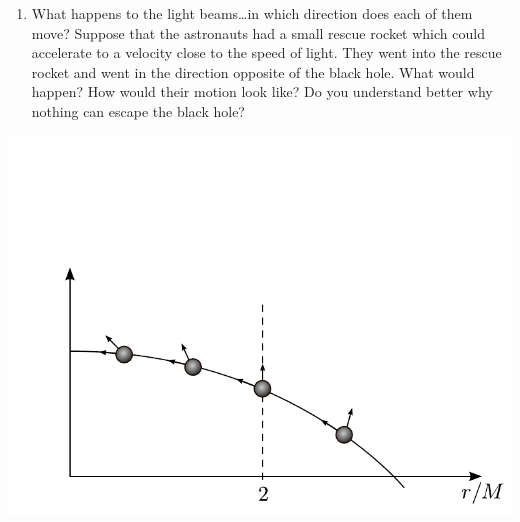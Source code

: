 \begin{multicols}{2}
\begin{enumerate}
\item What happens to the light beams\ldots in which direction does each of them move? Suppose that the astronauts had a small rescue rocket which could accelerate to a velocity close to the speed of light. They went into the rescue rocket and went in the direction opposite of the black hole. What would happen? How would their motion look like? Do you understand better why nothing can escape the black hole?
\end {enumerate}

\begin{Figure}
\centering
\includegraphics[width=\textwidth]{fig_17-10.pdf}
\end{Figure}


\end{multicols}



